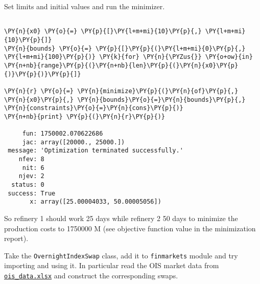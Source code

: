 \begin{Answer}
Set limits and initial values and run the minimizer.
\begin{tcolorbox}[breakable, size=fbox, boxrule=1pt, pad at break*=1mm,colback=cellbackground, colframe=cellborder]
\begin{Verbatim}[commandchars=\\\{\}]
        
\PY{n}{x0} \PY{o}{=} \PY{p}{[}\PY{l+m+mi}{10}\PY{p}{,} \PY{l+m+mi}{10}\PY{p}{]}
\PY{n}{bounds} \PY{o}{=} \PY{p}{[}\PY{p}{(}\PY{l+m+mi}{0}\PY{p}{,} \PY{l+m+mi}{100}\PY{p}{)} \PY{k}{for} \PY{n}{\PYZus{}} \PY{o+ow}{in} \PY{n+nb}{range}\PY{p}{(}\PY{n+nb}{len}\PY{p}{(}\PY{n}{x0}\PY{p}{)}\PY{p}{)}\PY{p}{]}

\PY{n}{r} \PY{o}{=} \PY{n}{minimize}\PY{p}{(}\PY{n}{of}\PY{p}{,} \PY{n}{x0}\PY{p}{,} \PY{n}{bounds}\PY{o}{=}\PY{n}{bounds}\PY{p}{,} \PY{n}{constraints}\PY{o}{=}\PY{n}{cons}\PY{p}{)}
\PY{n+nb}{print} \PY{p}{(}\PY{n}{r}\PY{p}{)}

     fun: 1750002.070622686
     jac: array([20000., 25000.])
 message: 'Optimization terminated successfully.'
    nfev: 8
     nit: 6
    njev: 2
  status: 0
 success: True
       x: array([25.00004033, 50.00005056])
    \end{Verbatim}
\end{tcolorbox}
    
 So refinery 1 should work 25 days while refinery 2 50 days to minimize the production costs to 1750000 M (see objective function value in the minimization report).
\end{Answer}

\begin{Exercise}[title={(OvernightIndexSwap)}]
Take the \texttt{OvernightIndexSwap} class, add it to \texttt{finmarkets} module and try importing and using it. In particular read the OIS market data from \href{https://drive.google.com/file/d/1LCEDmheKqwPXFpJ25hFz32QI5im2UJO1/view?usp=sharing}{\texttt{ois\_data.xlsx}} and construct the corresponding swaps.
\end{Exercise}

